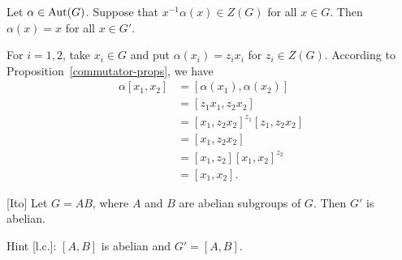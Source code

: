 \begin{exr}
    Let\/ $\alpha \in {\rm Aut}(G)$. Suppose that\/ $x^{-1}\alpha(x) \in Z(G)$ for all\/ $x\in G$. Then\/ $\alpha(x)=x$ for all\/ $x\in G'$.
\end{exr}

\begin{solution} For $i=1,2$, take $x_i\in G$ and put $\alpha(x_i)=z_ix_i$ for $z_i\in Z(G)$. According to Proposition~\ref{commutator-props}, we have
\begin{align*}
    \alpha[x_1,x_2] &= [\alpha(x_1),\alpha(x_2)]\\
        &= [z_1x_1,z_2x_2]\\
        &= [x_1,z_2x_2]^{z_1}[z_1,z_2x_2]\\
        &= [x_1,z_2x_2]\\
        &= [x_1,z_2][x_1,x_2]^{z_2}\\
        &= [x_1,x_2].
\end{align*}
 \end{solution}

\begin{exr} {\rm [Ito]}
    Let\/ $G = AB$, where\/ $A$ and\/ $B$ are abelian subgroups of\/ $G$. Then\/ $G'$ is abelian.

    \textrm{\rm Hint [l.c.]:} $[A,B]$ is abelian and $G'=[A,B]$.
\end{exr}

